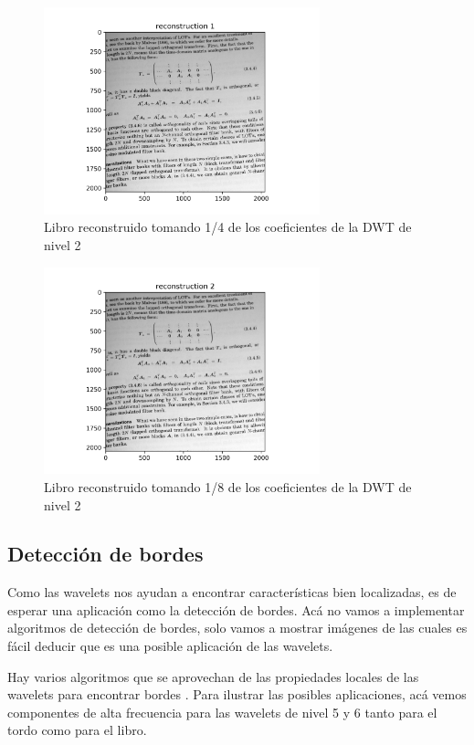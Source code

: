 \documentclass[conference]{IEEEtran}
\begin{document}
\begin{figure}[H]
\includegraphics[width=8cm]{images/book_r_1.png}
\caption{Libro reconstruido tomando 1/4 de los coeficientes de la DWT de nivel 2}
\end{figure}

\begin{figure}[H]
\includegraphics[width=8cm]{images/book_r_2.png}
\caption{Libro reconstruido tomando 1/8 de los coeficientes de la DWT de nivel 2}
\end{figure}

\subsection{Detección de bordes}

Como las wavelets nos ayudan a encontrar características bien localizadas, es de esperar una aplicación como la detección de bordes. Acá no vamos a implementar algoritmos de detección de bordes, solo vamos a mostrar imágenes de las cuales es fácil deducir que es una posible aplicación de las wavelets.

Hay varios algoritmos que se aprovechan de las propiedades locales de las wavelets para encontrar bordes \cite{edge1, edge2, edge3}. Para ilustrar las posibles aplicaciones, acá vemos componentes de alta frecuencia para las wavelets de nivel 5 y 6 tanto para el tordo como para el libro.
\end{document}
